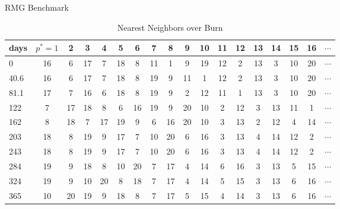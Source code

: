 \begin{slide}{RMG Benchmark}
\begin{table}[htbp]
\begin{center}
\caption{Nearest Neighbors over Burn}
\label{nn_table}
\tiny
\begin{tabular}{|l||cc|ccccccccccccccc|}
\hline
\textbf{days} & $p^*=1$ & 2 & 3 & 4 & 5 & 6 & 7 & 8 & 9 & 10 & 11 & 12 & 13 & 14 & 15 & 16 & $\cdots$ \\
\hline
0 & 16 & 6 & 17 & 7 & 18 & 8 & 11 & 1 & 9 & 19 & 12 & 2 & 13 & 3 & 10 & 20 & $\cdots$ \\
40.6 & 16 & 6 & 17 & 7 & 18 & 8 & 19 & 9 & 11 & 1 & 12 & 2 & 13 & 3 & 10 & 20 & $\cdots$ \\ 
81.1 & 17 & 7 & 16 & 6 & 18 & 8 & 19 & 9 & 2 & 12 & 11 & 1 & 13 & 3 & 10 & 20 & $\cdots$ \\
122 & 7 & 17 & 18 & 8 & 6 & 16 & 19 & 9 & 20 & 10 & 2 & 12 & 3 & 13 & 11 & 1 & $\cdots$ \\
162 & 8 & 18 & 7 & 17 & 19 & 9 & 6 & 16 & 20 & 10 & 3 & 13 & 2 & 12 & 4 & 14 & $\cdots$ \\
203 & 18 & 8 & 19 & 9 & 17 & 7 & 10 & 20 & 6 & 16 & 3 & 13 & 4 & 14 & 12 & 2 & $\cdots$ \\
243 & 18 & 8 & 19 & 9 & 17 & 7 & 10 & 20 & 6 & 16 & 3 & 13 & 4 & 14 & 12 & 2 & $\cdots$ \\
284 & 19 & 9 & 18 & 8 & 10 & 20 & 7 & 17 & 4 & 14 & 6 & 16 & 3 & 13 & 5 & 15 & $\cdots$ \\
324 & 19 & 9 & 10 & 20 & 8 & 18 & 7 & 17 & 4 & 14 & 5 & 15 & 3 & 13 & 6 & 16 & $\cdots$ \\
365 & 10 & 20 & 19 & 9 & 18 & 8 & 7 & 17 & 5 & 15 & 4 & 14 & 3 & 13 & 6 & 16 & $\cdots$ \\
\hline
\end{tabular}
\end{center}
\end{table}
\end{slide}
